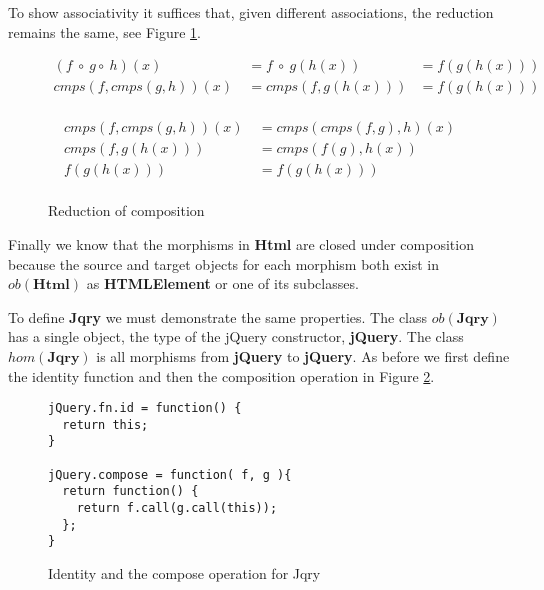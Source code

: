 \documentclass[preprint]{sigplanconf}
\begin{document}
To show associativity it suffices that, given different associations, the reduction remains the same, see Figure \ref{fig:html-associativity}.

\begin{figure}[!ht]
\begin{displaymath}
\begin{aligned}
(f\ \circ\ g \circ\ h)(x)\ &= f\ \circ\ g(h(x)) &= f(g(h(x)))\\
cmps(f,cmps(g,h))(x)\ &= cmps(f, g(h(x))) &= f(g(h(x)))\\
\end{aligned}
\end{displaymath}

\begin{displaymath}
\begin{aligned}
cmps(f,cmps(g,h))(x)\ &= cmps(cmps(f,g),h)(x) \\
cmps(f,g(h(x)))\ &= cmps(f(g),h(x)) \\
f(g(h(x)))\ &= f(g(h(x)))\\
\end{aligned}
\end{displaymath}
\nocaptionrule \caption{Reduction of composition}
\label{fig:html-associativity}
\end{figure}

Finally we know that the morphisms in \textbf{Html} are closed under composition because the source and target objects for each morphism both exist in \begin{math}ob(\mathbf{Html})\end{math} as \textbf{HTMLElement} or one of its subclasses.

To define \textbf{Jqry} we must demonstrate the same properties. The class \begin{math}ob(\mathbf{Jqry})\end{math} has a single object, the type of the jQuery constructor, \textbf{jQuery}. The class \begin{math}hom(\mathbf{Jqry})\end{math} is all morphisms from \textbf{jQuery} to \textbf{jQuery}. As before we first define the identity function and then the composition operation in Figure \ref{fig:jquery-id-compose}.

\begin{figure}[!ht]
\small
\begin{verbatim}
jQuery.fn.id = function() {
  return this;
}

jQuery.compose = function( f, g ){
  return function() {
    return f.call(g.call(this));
  };
}
\end{verbatim}
\nocaptionrule \caption{Identity and the compose operation for Jqry}
\label{fig:jquery-id-compose}
\end{figure}
\end{document}
